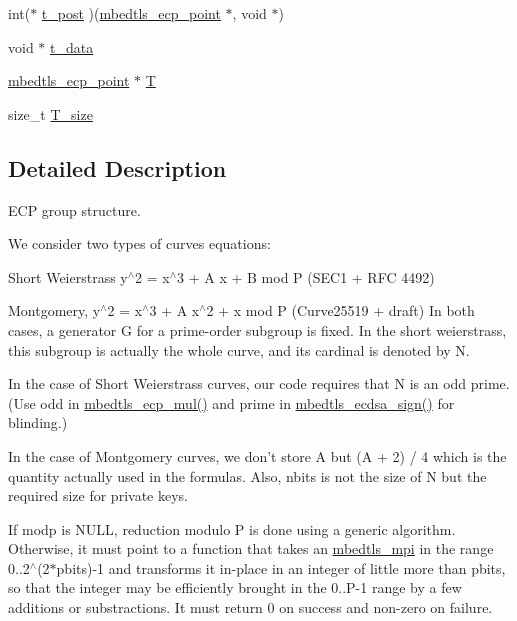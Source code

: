 \begin{DoxyCompactItemize}
\item 
int($\ast$ \hyperlink{structmbedtls__ecp__group_a21a27617d962734b66bcc567fbeeab99}{t\-\_\-post} )(\hyperlink{structmbedtls__ecp__point}{mbedtls\-\_\-ecp\-\_\-point} $\ast$, void $\ast$)
\item 
void $\ast$ \hyperlink{structmbedtls__ecp__group_a7400fa2acba24d9b8a7a107d9fcde36f}{t\-\_\-data}
\item 
\hyperlink{structmbedtls__ecp__point}{mbedtls\-\_\-ecp\-\_\-point} $\ast$ \hyperlink{structmbedtls__ecp__group_a4beb01054d800f047b5479f4e0e8d7d8}{T}
\item 
size\-\_\-t \hyperlink{structmbedtls__ecp__group_a4b9a1bf79d2023dbc3807dc7e12059af}{T\-\_\-size}
\end{DoxyCompactItemize}


\subsection{Detailed Description}
E\-C\-P group structure. 

We consider two types of curves equations\-:
\begin{DoxyEnumerate}
\item Short Weierstrass y$^\wedge$2 = x$^\wedge$3 + A x + B mod P (S\-E\-C1 + R\-F\-C 4492)
\item Montgomery, y$^\wedge$2 = x$^\wedge$3 + A x$^\wedge$2 + x mod P (Curve25519 + draft) In both cases, a generator G for a prime-\/order subgroup is fixed. In the short weierstrass, this subgroup is actually the whole curve, and its cardinal is denoted by N.
\end{DoxyEnumerate}

In the case of Short Weierstrass curves, our code requires that N is an odd prime. (Use odd in \hyperlink{ecp_8h_a4d005045c302e100c78bdc587e8f0e6a}{mbedtls\-\_\-ecp\-\_\-mul()} and prime in \hyperlink{ecdsa_8h_af10f6fda2169862871d0ac07555c8641}{mbedtls\-\_\-ecdsa\-\_\-sign()} for blinding.)

In the case of Montgomery curves, we don't store A but (A + 2) / 4 which is the quantity actually used in the formulas. Also, nbits is not the size of N but the required size for private keys.

If modp is N\-U\-L\-L, reduction modulo P is done using a generic algorithm. Otherwise, it must point to a function that takes an \hyperlink{structmbedtls__mpi}{mbedtls\-\_\-mpi} in the range 0..2$^\wedge$(2$\ast$pbits)-\/1 and transforms it in-\/place in an integer of little more than pbits, so that the integer may be efficiently brought in the 0..P-\/1 range by a few additions or substractions. It must return 0 on success and non-\/zero on failure. 

